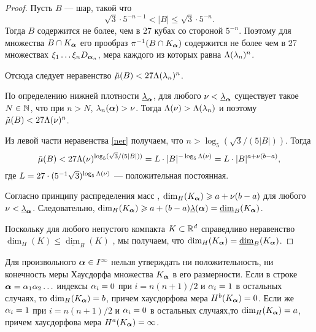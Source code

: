 \begin{proof}
Пусть $B$ --- шар, такой что
\begin{equation}\label{ner}
{\sqrt{3}}\cdot 5^{-n-1}<|B|\le{\sqrt{3}}\cdot 5^{-n}.
\end{equation}
Тогда $B$ содержится не более, чем в 27 кубах со стороной $5^{-n}$. 
Поэтому для множества $B\cap K_{\bm{\alpha}}$  его прообраз $\pi^{-1}(B\cap K_{\bm{\alpha}})$ содержится не более чем в 27 множествах  $\xi_1\ldots \xi_n D_{{\bm{\alpha}}_n}$, мера каждого из которых равна $\Lambda(\lambda_n)^n$.

Отсюда следует неравенство $\tilde\mu(B)<27\Lambda(\lambda_n)^n$.

По определению нижней плотности $\underline{\lambda}_{\bm{\alpha}}$, для любого $\nu<\underline{\lambda}_{\bm{\alpha}}$ существует такое $N\in\mathbb{N}$, что при $n>N$, $\lambda_n({\bm{\alpha}}) > \nu$. 
Тогда $\Lambda(\nu)>\Lambda(\lambda_n)$  и поэтому  $\tilde\mu(B)<27\Lambda(\nu)^n$.

Из левой части неравенства \eqref{ner} получаем, что $n>\log_5(\sqrt{3}/(5|B|))$.
Тогда 
\begin{equation}
\tilde\mu(B)<27 \Lambda(\nu)^{\log_5(\sqrt{3}/(5|B|))}=L\cdot|B|^{-\log_5{\Lambda(\nu)}} =L\cdot |B|^{a+\nu(b-a)},
\end{equation}
где $L=27\cdot(5^{-1}\sqrt{3})^{\log_5{\Lambda(\nu)}}$ --- положительная постоянная.

Согласно принципу распределения масс \cite[Mass distribution Principle~4.2, p.55]{Falconer2004}, $\dim_H(K_{\bm{\alpha}})\geqslant a+\nu(b-a)$ для любого $\nu<\underline{\lambda}_{\bm{\alpha}}$.
Следовательно, $\dim_H(K_{\bm{\alpha}})\geqslant  a+(b-a)\underline{\lambda}({\bm{\alpha}}) =\underline{\dim}_B(K_{\bm{\alpha}})$.

Поскольку  для любого непустого компакта $K\subset\mathbb{R}^d$ справедливо неравенство $\dim_H(K)\leqslant\underline{\dim}_B(K)$ \cite[(3.17), p.~43]{Falconer2004}, мы получаем, что $\dim_H( K_{\bm{\alpha}})=\underline{\dim}_B( K_{\bm{\alpha}})$.
\end{proof}

\begin{remark} 
Для произвольного ${\bm{\alpha}}\in I^\infty$ нельзя утверждать ни положительность, ни конечность меры Хаусдорфа множества $K_{\bm{\alpha}}$ в его размерности. 
Если в строке ${\bm{\alpha}}=\alpha_1\alpha_2\ldots$ индексы $\alpha_i=0$ при  $i=n(n+1)/2$ и $\alpha_i=1$ в остальных случаях, то $\dim_H(K_{\bm{\alpha}})=b$, причем хаусдорфова мера $H^b(K_{\bm{\alpha}})=0$.
Если же $\alpha_i=1$ при  $i=n(n+1)/2$ и $\alpha_i=0$ в остальных случаях,то $\dim_H(K_{\bm{\alpha}})=a$, причем хаусдорфова мера $H^a(K_{\bm{\alpha}})=\infty$.
\end{remark}
 
 
 
 